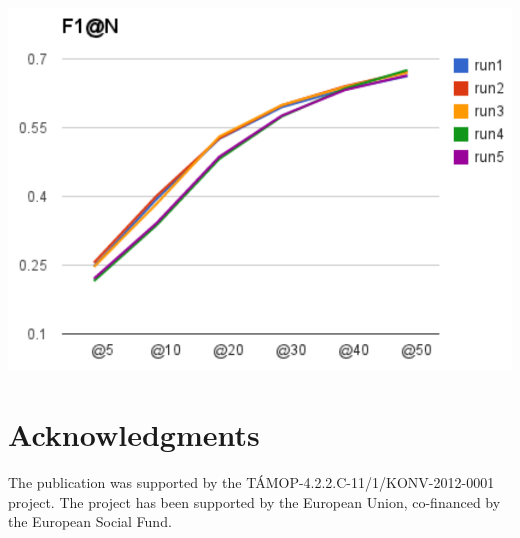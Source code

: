 \documentclass{acm_proc_article-me}
\begin{document}
\includegraphics[width=0.9\linewidth]{f1}




\section{Acknowledgments}

The publication was supported by the T\'AMOP-4.2.2.C-11/1/KONV-2012-0001 project. The project has been supported by the European Union, co-financed by the European Social Fund.



\end{document}

